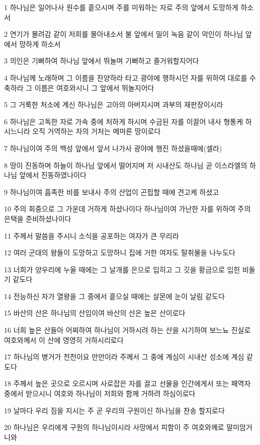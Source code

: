 \par 1 하나님은 일어나사 원수를 흩으시며 주를 미워하는 자로 주의 앞에서 도망하게 하소서
\par 2 연기가 몰려감 같이 저희를 몰아내소서 불 앞에서 밀이 녹음 같이 악인이 하나님 앞에서 망하게 하소서
\par 3 의인은 기뻐하여 하나님 앞에서 뛰놀며 기뻐하고 즐거워할지어다
\par 4 하나님께 노래하며 그 이름을 찬양하라 타고 광야에 행하시던 자를 위하여 대로를 수축하라 그 이름은 여호와시니 그 앞에서 뛰놀지어다
\par 5 그 거룩한 처소에 계신 하나님은 고아의 아버지시며 과부의 재판장이시라
\par 6 하나님은 고독한 자로 가속 중에 처하게 하시며 수금된 자를 이끌어 내사 형통케 하시느니라 오직 거역하는 자의 거처는 메마른 땅이로다
\par 7 하나님이여 주의 백성 앞에서 앞서 나가사 광야에 행진 하셨을때에(셀라)
\par 8 땅이 진동하며 하늘이 하나님 앞에서 떨어지며 저 시내산도 하나님 곧 이스라엘의 하나님 앞에서 진동하였나이다
\par 9 하나님이여 흡족한 비를 보내사 주의 산업이 곤핍할 때에 견고케 하셨고
\par 10 주의 회중으로 그 가운데 거하게 하셨나이다 하나님이여 가난한 자를 위하여 주의 은택을 준비하셨나이다
\par 11 주께서 말씀을 주시니 소식을 공포하는 여자가 큰 무리라
\par 12 여러 군대의 왕들이 도망하고 도망하니 집에 거한 여자도 탈취물을 나누도다
\par 13 너희가 양우리에 누울 때에는 그 날개를 은으로 입히고 그 깃을 황금으로 입힌 비둘기 같도다
\par 14 전능하신 자가 열왕을 그 중에서 흩으실 때에는 살몬에 눈이 날림 같도다
\par 15 바산의 산은 하나님의 산임이여 바산의 산은 높은 산이로다
\par 16 너희 높은 산들아 어찌하여 하나님이 거하시려 하는 산을 시기하여 보느뇨 진실로 여호와께서 이 산에 영영히 거하시리로다
\par 17 하나님의 병거가 천천이요 만만이라 주께서 그 중에 계심이 시내산 성소에 계심 같도다
\par 18 주께서 높은 곳으로 오르시며 사로잡은 자를 끌고 선물을 인간에게서 또는 패역자 중에서 받으시니 여호와 하나님이 저희와 함께 거하려 하심이로다
\par 19 날마다 우리 짐을 지시는 주 곧 우리의 구원이신 하나님을 찬송 할지로다
\par 20 하나님은 우리에게 구원의 하나님이시라 사망에서 피함이 주 여호와께로 말미암거니와
